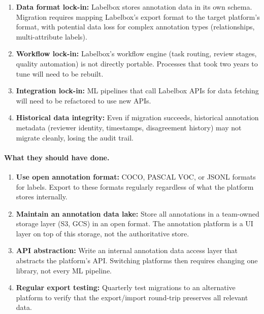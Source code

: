 \begin{enumerate}
    \item \textbf{Data format lock-in:} Labelbox stores annotation data in its own schema. Migration requires mapping Labelbox's export format to the target platform's format, with potential data loss for complex annotation types (relationships, multi-attribute labels).

    \item \textbf{Workflow lock-in:} Labelbox's workflow engine (task routing, review stages, quality automation) is not directly portable. Processes that took two years to tune will need to be rebuilt.

    \item \textbf{Integration lock-in:} ML pipelines that call Labelbox APIs for data fetching will need to be refactored to use new APIs.

    \item \textbf{Historical data integrity:} Even if migration succeeds, historical annotation metadata (reviewer identity, timestamps, disagreement history) may not migrate cleanly, losing the audit trail.
\end{enumerate}

\paragraph{What they should have done.}

\begin{enumerate}
    \item \textbf{Use open annotation format:} COCO, PASCAL VOC, or JSONL formats for labels. Export to these formats regularly regardless of what the platform stores internally.

    \item \textbf{Maintain an annotation data lake:} Store all annotations in a team-owned storage layer (S3, GCS) in an open format. The annotation platform is a UI layer on top of this storage, not the authoritative store.

    \item \textbf{API abstraction:} Write an internal annotation data access layer that abstracts the platform's API. Switching platforms then requires changing one library, not every ML pipeline.

    \item \textbf{Regular export testing:} Quarterly test migrations to an alternative platform to verify that the export/import round-trip preserves all relevant data.
\end{enumerate}

